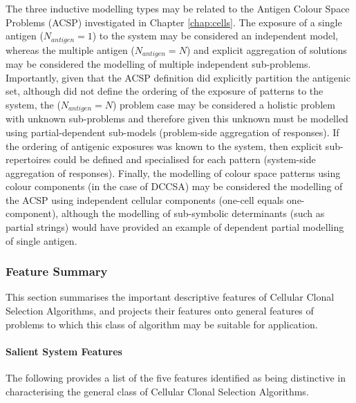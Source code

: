 The three inductive modelling types may be related to the Antigen Colour Space Problems (ACSP) investigated in Chapter \ref{chap:cells}. The exposure of a single antigen ($N_{antigen}=1$) to the system may be considered an independent model, whereas the multiple antigen ($N_{antigen}=N$) and explicit aggregation of solutions may be considered the modelling of multiple independent sub-problems. Importantly, given that the ACSP definition did explicitly partition the antigenic set, although did not define the ordering of the exposure of patterns to the system, the ($N_{antigen}=N$) problem case may be considered a holistic problem with unknown sub-problems and therefore given this unknown must be modelled using partial-dependent sub-models (problem-side aggregation of responses). If the ordering of antigenic exposures was known to the system, then explicit sub-repertoires could be defined and specialised for each pattern (system-side aggregation of responses). Finally, the modelling of colour space patterns using colour components (in the case of DCCSA) may be considered the modelling of the ACSP using independent cellular components (one-cell equals one-component), although the modelling of sub-symbolic determinants (such as partial strings) would have provided an example of dependent partial modelling of single antigen. 


%
%
\subsubsection{Feature Summary}
This section summarises the important descriptive features of Cellular Clonal Selection Algorithms, and projects their features onto general features of problems to which this class of algorithm may be suitable for application.

%
%
\paragraph{Salient System Features}
The following provides a list of the five features identified as being distinctive in characterising the general class of Cellular Clonal Selection Algorithms. 


